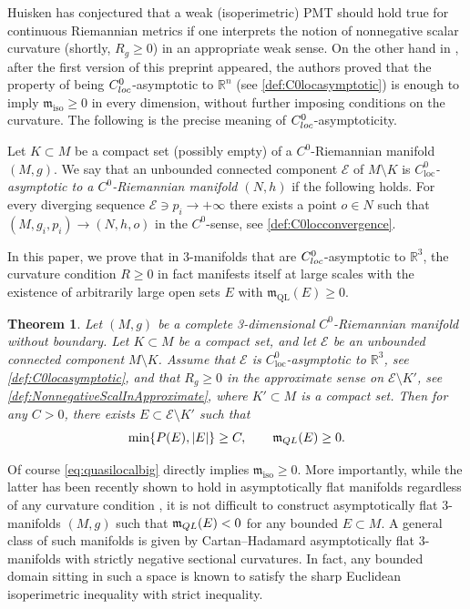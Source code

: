 \documentclass[a4paper,12pt,reqno]{amsart}
\numberwithin{equation}{section}
\theoremstyle{plain}
\newtheorem{theorem}{Theorem}[section]
\theoremstyle{definition}
\theoremstyle{remark}
\begin{document}
Huisken has conjectured \cite{Huisken2} that a weak (isoperimetric) PMT should hold true for continuous Riemannian metrics if one interprets the notion of nonnegative scalar curvature (shortly, $R_g\geq 0$) in an appropriate weak sense. On the other hand in \cite{JaureguiLeeUnger24IsoperimetricMass}, after the first version of this preprint appeared, the authors proved that the property of being $C^0_{\rm loc}$-asymptotic to $\mathbb R^n$ (see \cref{def:C0locasymptotic}) is enough to imply $\mathfrak{m}_{\mathrm{iso}}\geq 0$ in every dimension, without further imposing conditions on the curvature. 
The following is the precise meaning of  $C^0_{\rm loc}$-asymptoticity.
\begin{definition}\label{def:C0locasymptotic}
    Let $K\subset M$ be a compact set (possibly empty) of a $C^0$-Riemannian manifold $(M,g)$. We say that an unbounded connected component $\mathcal{E}$ of $M\setminus K$ is \textit{$C^{0}_{\mathrm{loc}}$-asymptotic to a $C^0$-Riemannian manifold $(N,h)$} if the following holds. For every diverging sequence $\mathcal{E}\ni p_i\to +\infty$ there exists a point $o\in N$ such that $(M,g_i,p_i)\to (N,h,o)$ in the $C^0$-sense, see \cref{def:C0locconvergence}.
\end{definition}


In this paper, we prove that in $3$-manifolds that are $C^0_{\rm loc}$-asymptotic to $\mathbb{R}^3$, the curvature condition $R\geq 0$ in fact manifests itself at large scales with the existence of arbitrarily large open sets $E$ with $\mathfrak{m}_{\mathrm{QL}}(E)\geq 0$.


\begin{theorem}\label{thm:CorMassa}
Let $(M,g)$ be a complete 3-dimensional $C^0$-Riemannian manifold without boundary. Let $K\subset M$ be a compact set, and let $\mathcal{E}$ be an unbounded connected component $M\setminus K$. Assume that $\mathcal{E}$ is $C^0_{\mathrm{loc}}$-asymptotic to $\mathbb R^3$, see \cref{def:C0locasymptotic}, and that $R_{g}\geq 0$ in the approximate sense on $\mathcal{E} \setminus K'$, see \cref{def:NonnegativeScalInApproximate}, where $K'\subset M$ is a compact set.
Then for any ${C}>0$, there exists $E \subset \mathcal{E} \setminus K'$ such that
\begin{equation}
\label{eq:quasilocalbig}
\min\{P(E),|E|\}\ge {C} ,
\qquad
\mathfrak{m}_{\rm QL}(E) \ge 0.
\end{equation}
\end{theorem}

Of course \eqref{eq:quasilocalbig} directly implies $\mathfrak{m}_{\mathrm{iso}}\geq 0$. 
More importantly, while the latter has been recently shown to hold in asymptotically flat manifolds regardless of any curvature condition \cite{JaureguiLeeUnger24IsoperimetricMass}, it is not difficult to construct asymptotically flat $3$-manifolds $(M, g)$ such that $\mathfrak{m}_{\rm QL}(E) < 0$ for any bounded $E \subset M$. A general class of such manifolds is given by Cartan--Hadamard asymptotically flat $3$-manifolds with strictly negative sectional curvatures. In fact, any bounded domain sitting in such a space is known to satisfy the sharp Euclidean isoperimetric inequality \cite{kleiner-isoperimetric} with strict inequality.
\end{document}
